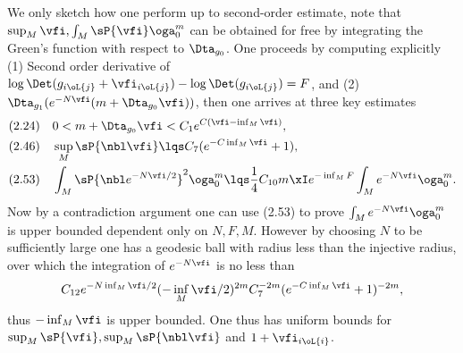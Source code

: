 \documentclass[a4paper, twoside]{article}
\begin{document}
\begin{prf}
\begin{enr}[label = (\arabic*)]
		We only sketch how one perform up to second-order estimate, note that $\sup_{M}\vfi,\int_{M}\sP{\vfi}\oga_{0}^{m}$ can be obtained for free by integrating the Green's function with respect to $\Dta_{g_{0}}$. One proceeds by computing explicitly (1) Second order derivative of $\log\Det(g_{i\oL{j}}+\vfi_{i\oL{j}})-\log\Det(g_{i\oL{j}})=F$, and (2) $\Dta_{g_{1}}(e^{-N\vfi}(m+\Dta_{g_{0}}\vfi))$, then one arrives at three key estimates
		\begin{align*}
		  (2.24)&\quad 0<m+\Dta_{g_{0}}\vfi<C_{1}e^{C(\vfi-\inf_{M}\vfi)},\\
		  (2.46)&\quad \sup_{M}\sP{\nbl\vfi}\lqs C_{7}(e^{-C\inf_{M}\vfi}+1),\\
		  (2.53)&\quad \int_{M}\sP{\nbl e^{-N\vfi/2}}^{2}\oga_{0}^{m}\lqs \frac{1}{4}C_{10}m\xI e^{-\inf_{M}F}\int_{M}e^{-N\vfi}\oga_{0}^{m}.
		\end{align*}
		Now by a contradiction argument one can use (2.53) to prove $\int_{M}e^{-N\vfi}\oga_{0}^{m}$ is upper bounded dependent only on $N,F,M$. However by choosing $N$ to be sufficiently large one has a geodesic ball with radius less than the injective radius, over which the integration of $e^{-N\vfi}$ is no less than
		\[
			C_{12}e^{-N\inf_{M}\vfi/2}(-\inf_{M}\vfi/2)^{2m}C_{7}^{-2m}(e^{-C\inf_{M}\vfi}+1)^{-2m},
		\]
		thus $-\inf_{M}\vfi$ is upper bounded. One thus has uniform bounds for $\sup_{M}\sP{\vfi},\sup_{M}\sP{\nbl\vfi}$ and $1+\vfi_{i\oL{i}}$.
	\end{enr}
\end{prf}


\printref
\end{document}
